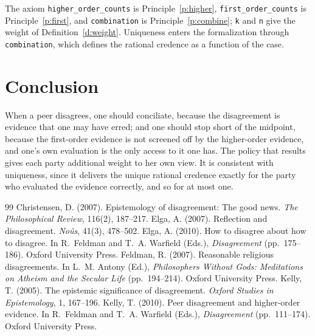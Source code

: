 \documentclass{situationist-preprint}
\begin{document}
The axiom \texttt{higher\_order\_counts} is Principle~\ref{p:higher}, \texttt{first\_order\_counts} is Principle~\ref{p:first}, and \texttt{combination} is Principle~\ref{p:combine}; \texttt{k} and \texttt{n} give the weight of Definition~\ref{d:weight}. Uniqueness enters the formalization through \texttt{combination}, which defines the rational credence as a function of the case.

\section{Conclusion}

When a peer disagrees, one should conciliate, because the disagreement is evidence that one may have erred; and one should stop short of the midpoint, because the first-order evidence is not screened off by the higher-order evidence, and one's own evaluation is the only access to it one has. The policy that results gives each party additional weight to her own view. It is consistent with uniqueness, since it delivers the unique rational credence exactly for the party who evaluated the evidence correctly, and so for at most one.

\begin{thebibliography}{99}\small
{} Christensen, D. (2007). Epistemology of disagreement: The good news. \emph{The Philosophical Review}, 116(2), 187--217.
 Elga, A. (2007). Reflection and disagreement. \emph{No\^us}, 41(3), 478--502.
 Elga, A. (2010). How to disagree about how to disagree. In R.~Feldman and T.~A. Warfield (Eds.), \emph{Disagreement} (pp.~175--186). Oxford University Press.
 Feldman, R. (2007). Reasonable religious disagreements. In L.~M. Antony (Ed.), \emph{Philosophers Without Gods: Meditations on Atheism and the Secular Life} (pp.~194--214). Oxford University Press.
 Kelly, T. (2005). The epistemic significance of disagreement. \emph{Oxford Studies in Epistemology}, 1, 167--196.
 Kelly, T. (2010). Peer disagreement and higher-order evidence. In R.~Feldman and T.~A. Warfield (Eds.), \emph{Disagreement} (pp.~111--174). Oxford University Press.
\end{thebibliography}
\end{document}
